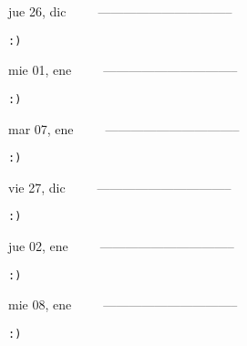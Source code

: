 \documentclass[letterpaper,10pt]{article}
\begin{document}
\begin{multicols}{3}
{jue 26, dic\ \ \ \ \ --------------------------------}
\begin{flushright}\begin{small}\texttt{:)}\end{small}\end{flushright}
\vfill
{mie 01, ene\ \ \ \ \ --------------------------------}
\begin{flushright}\begin{small}\texttt{:)}\end{small}\end{flushright}\par
\vfill
{mar 07, ene\ \ \ \ \ --------------------------------}
\begin{flushright}\begin{small}\texttt{:)}\end{small}\end{flushright}\par
\vfill
\end{multicols}
\vspace{1.05cm}

\begin{multicols}{3}
{vie 27, dic\ \ \ \ \ --------------------------------}
\begin{flushright}\begin{small}\texttt{:)}\end{small}\end{flushright}
\vfill
{jue 02, ene\ \ \ \ \ --------------------------------}
\begin{flushright}\begin{small}\texttt{:)}\end{small}\end{flushright}\par
\vfill
{mie 08, ene\ \ \ \ \ --------------------------------}
\begin{flushright}\begin{small}\texttt{:)}\end{small}\end{flushright}\par
\vfill
\end{multicols}
\vspace{1.05cm}
\end{document}
